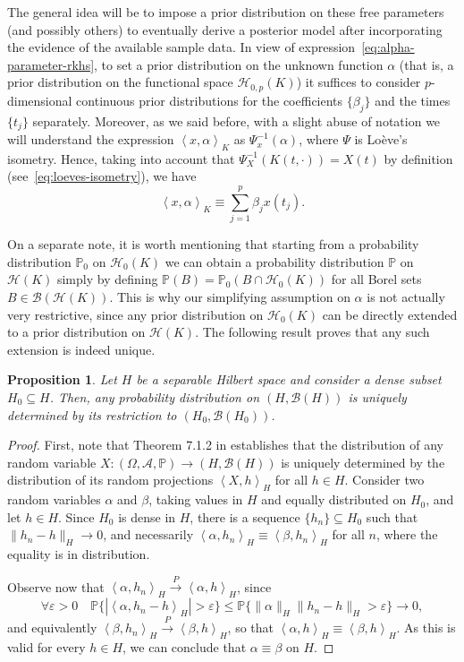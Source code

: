 \documentclass[ba]{imsart}
\numberwithin{equation}{section}
\theoremstyle{plain}
\newtheorem{prop}{Proposition}[section]
\renewcommand{\epsilon}{\varepsilon}
\newcommand\dotprod[2]{\left\langle #1, #2 \right\rangle}
\begin{document}
The general idea will be to impose a prior distribution on these free parameters (and possibly others) to eventually derive a posterior model after incorporating the evidence of the available sample data. In view of expression~\eqref{eq:alpha-parameter-rkhs}, to set a prior distribution on the unknown function \(\alpha\) (that is, a prior distribution on the functional space \(\mathcal H_{0,p}(K)\)) it suffices to consider \(p\)-dimensional continuous prior distributions for the coefficients \(\{\beta_j\}\) and the times \(\{t_j\}\) separately. Moreover, as we said before, with a slight abuse of notation we will understand the expression \(\dotprod{x}{\alpha}_K\) as \(\Psi_x^{-1}(\alpha)\), where \(\Psi\) is Loève's isometry. Hence, taking into account that \(\Psi_X^{-1}(K(t, \cdot)) = X(t)\) by definition (see~\eqref{eq:loeves-isometry}), we have
\[
\dotprod{x}{\alpha}_K \equiv \sum_{j=1}^p \beta_j x(t_j).
\]

On a separate note, it is worth mentioning that starting from a probability distribution \(\mathbb{P}_0\) on \(\mathcal H_0(K)\) we can obtain a probability distribution \(\mathbb{P}\) on \(\mathcal H(K)\) simply by defining \(\mathbb{P}(B) = \mathbb{P}_0(B\cap \mathcal H_0(K))\) for all Borel sets \(B \in \mathcal B(\mathcal H(K))\). This is why our simplifying assumption on \(\alpha\) is not actually very restrictive, since any prior distribution on \(\mathcal H_0(K)\) can be directly extended to a prior distribution on \(\mathcal H(K)\). The following result proves that any such extension is indeed unique.

\begin{prop} Let \(H\) be a separable Hilbert space and consider a dense subset \(H_0\subseteq H\). Then, any probability distribution on \((H, \mathcal{B}(H))\) is uniquely determined by its restriction to \((H_0, \mathcal B(H_0))\).
\end{prop}

\begin{proof}

First, note that Theorem 7.1.2 in \citet[p.~177]{hsing2015theoretical} establishes that the distribution of any random variable \(X: (\Omega, \mathcal A, \mathbb{P})\to (H, \mathcal B(H))\) is uniquely determined by the distribution of its random projections \(\dotprod{X}{h}_H\) for all \(h \in H\).
Consider two random variables \(\alpha\) and \(\beta\), taking values in \(H\) and equally distributed on \(H_0\), and let \(h \in H\). Since \(H_0\) is dense in \(H\), there is a sequence \(\{h_n\}\subseteq H_0\) such that \(\|h_n - h\|_H \to 0\), and necessarily \(\dotprod{\alpha}{h_n}_H \equiv \dotprod{\beta}{h_n}_H\) for all \(n\), where the equality is in distribution.

Observe now that \(\dotprod{\alpha}{h_n}_H \overset{P}{\to} \dotprod{\alpha}{h}_H\), since
\[
\forall \epsilon > 0 \quad \mathbb{P}\{|\dotprod{\alpha}{h_n - h}_H| > \epsilon\} \leq \mathbb{P}\{\|\alpha\|_H \|h_n - h\|_H > \epsilon\} \to 0,
\]
and equivalently \(\dotprod{\beta}{h_n}_H \overset{P}{\to} \dotprod{\beta}{h}_H\), so that \(\dotprod{\alpha}{h}_H \equiv \dotprod{\beta}{h}_H\). As this is valid for every \(h \in H\), we can conclude that \(\alpha \equiv \beta\) on \(H\).
\end{proof}
\end{document}
